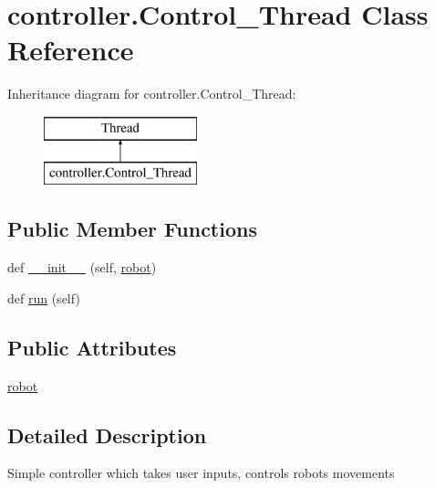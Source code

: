 \hypertarget{classcontroller_1_1_control___thread}{}\section{controller.\+Control\+\_\+\+Thread Class Reference}
\label{classcontroller_1_1_control___thread}
Inheritance diagram for controller.\+Control\+\_\+\+Thread\+:\begin{figure}[H]
\begin{center}
\leavevmode
\includegraphics[height=2.000000cm]{classcontroller_1_1_control___thread}
\end{center}
\end{figure}
\subsection*{Public Member Functions}
\begin{DoxyCompactItemize}
\item 
def \mbox{\hyperlink{classcontroller_1_1_control___thread_a56f033bd2097d4fd92d5cbef29f48929}{\+\_\+\+\_\+init\+\_\+\+\_\+}} (self, \mbox{\hyperlink{classcontroller_1_1_control___thread_a4f9d431655d0036c127cc9539d5f6899}{robot}})
\item 
def \mbox{\hyperlink{classcontroller_1_1_control___thread_a56f8c6a8b6f9bf8ebc91a9a44e443993}{run}} (self)
\end{DoxyCompactItemize}
\subsection*{Public Attributes}
\begin{DoxyCompactItemize}
\item 
\mbox{\hyperlink{classcontroller_1_1_control___thread_a4f9d431655d0036c127cc9539d5f6899}{robot}}
\end{DoxyCompactItemize}


\subsection{Detailed Description}
\begin{DoxyVerb}Simple controller which takes user inputs, controls robots movements
\end{DoxyVerb}
 

